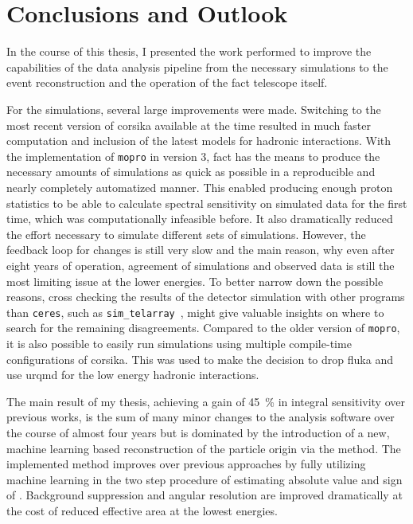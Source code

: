 \chapter{Conclusions and Outlook}\label{chp:outlook}
In the course of this thesis, I presented the work performed to improve the capabilities
of the \facttools{} data analysis pipeline from the necessary simulations
to the event reconstruction and the operation of the \gls{fact} telescope itself.

For the simulations, several large improvements were made.
Switching to the most recent version of \gls{corsika} available at the time
resulted in much faster computation and inclusion of the latest models for
hadronic interactions.
With the implementation of \texttt{mopro} in version 3, \gls{fact} has the means
to produce the necessary amounts of simulations as quick as possible in a reproducible
and nearly completely automatized manner.
This enabled producing enough proton statistics to be able to calculate spectral
sensitivity on simulated data for the first time, which was computationally infeasible
before.
It also dramatically reduced the effort necessary to simulate different sets
of simulations.
However, the feedback loop for changes is still very slow and
the main reason, why even after eight years of operation, agreement of
simulations and observed data is still the most limiting issue at the lower energies.
To better narrow down the possible reasons, cross checking the results of the detector simulation
with other programs than \texttt{ceres}, such as \texttt{sim\_telarray}~\cite{iactatmo},
might give valuable insights on where to search for the remaining disagreements.
Compared to the older version of \texttt{mopro}, it is also possible to
easily run simulations using multiple compile-time configurations of \gls{corsika}.
This was used to make the decision to drop \gls{fluka} and use \gls{urqmd} for the low energy hadronic interactions.

The main result of my thesis, achieving a gain of \SI{45}{\percent} in integral sensitivity over previous works,
is the sum of many minor changes to the analysis software over the course of almost four
years but is dominated by the introduction of a new, machine learning based reconstruction of the particle origin via the  method.
The implemented method improves over previous approaches by fully utilizing
machine learning in the two step procedure of estimating absolute value and sign of
.
Background suppression and angular resolution are improved dramatically at
the cost of reduced effective area at the lowest energies.

